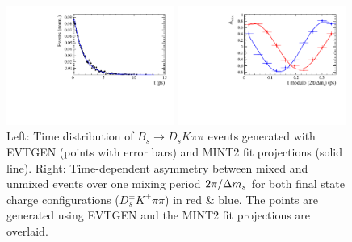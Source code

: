 \clearpage
\begin{figure}[h]
	\centering
		\includegraphics[width=0.49\textwidth, height = !]{figs/timeFit/signal_DsKpipi_CPV_MC/h_t.pdf} 
		
		\includegraphics[width=0.49\textwidth, height = !]{figs/timeFit/signal_DsKpipi_CPV_MC/h_asym.pdf} 
		
		\caption{Left: Time distribution of $B_s \to D_s K \pi\pi$ events generated with \textsf{EVTGEN} (points with error bars) and \textsf{MINT2} fit projections (solid line). 
                  Right: Time-dependent asymmetry between mixed and unmixed events over one mixing period $2\pi/{\Delta m_{{s}}}$ for both final state charge configurations ($D^{\pm}_{s}K^{\mp}\pi\pi$) in red \& blue. 
                  The points are generated using \textsf{EVTGEN} and the \textsf{MINT2} fit projections are overlaid.}
		\label{fig:FitGenMC}	
\end{figure}	

